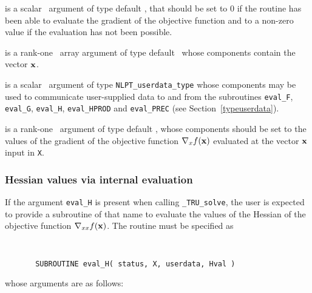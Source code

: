 \documentclass{galahad}
\newcommand{\packagename}{TRU}
\newcommand{\fullpackagename}{\libraryname\_\packagename}
\newcommand{\solver}{{\tt \fullpackagename\_solve}}
\begin{document}
\begin{description}
 is a scalar \intentout\ argument of type default \integer,
that should be set to 0 if the routine has been able to evaluate
the gradient of the objective function
and to a non-zero value if the evaluation has not been possible.

 is a rank-one \intentin\ array argument of type default \realdp\
whose components contain the vector ${\mathbf{x}}$.

 is a scalar \intentinout\ argument of type
{\tt NLPT\_userdata\_type} whose components may be used
to communicate user-supplied data to and from the
subroutines {\tt eval\_F}, {\tt eval\_G},
{\tt eval\_H}, {\tt eval\_HPROD} and {\tt eval\_PREC}
(see Section~\ref{typeuserdata}).

 is a rank-one \intentout\ argument of type default \realdp,
whose components should be set to the values of the gradient
of the objective function $\nabla_x f({\mathbf{x}})$
evaluated at the vector ${\mathbf{x}}$ input in {\tt X}.

\end{description}


\subsubsection{Hessian values via internal evaluation\label{hfv}}

If the argument {\tt eval\_H} is present when calling \solver, the
user is expected to provide a subroutine of that name to evaluate the
values of the Hessian of the objective function $\nabla_{xx} f({\mathbf{x}})$.
The routine must be specified as

\def\baselinestretch{0.8}
{\tt
\begin{verbatim}
       SUBROUTINE eval_H( status, X, userdata, Hval )
\end{verbatim} }
\def\baselinestretch{1.0}
\noindent whose arguments are as follows:
\end{document}
